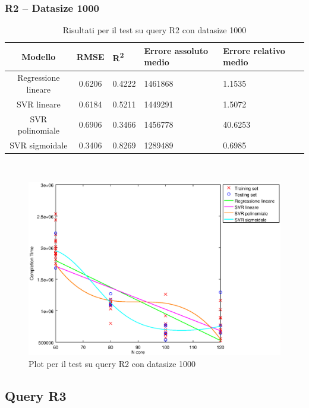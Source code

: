 \documentclass[a4paper,11pt]{article}
\begin{document}
\subsubsection{R2 -- Datasize 1000}
\begin{table}[bhpt]
	\centering
	\begin{adjustbox}{center}
		\begin{tabular}{c | c M{1.2cm} M{2.5cm} M{2.5cm} M{1.8cm}}
			Modello & RMSE & R\textsuperscript{2} & Errore assoluto medio & Errore relativo medio \tabularnewline
			\hline
			Regressione lineare & 0.6206 & 0.4222 & 1461868 & 1.1535 \\
			SVR lineare & 0.6184 & 0.5211 & 1449291 & 1.5072 \\
			SVR polinomiale & 0.6906 & 0.3466 & 1456778 & 40.6253 \\
			SVR sigmoidale & 0.3406 & 0.8269 & 1289489 & 0.6985 \\
		\end{tabular}
	\end{adjustbox}
	\\
	\caption{Risultati per il test su query R2 con datasize 1000}
	\label{table_R2_1000}
\end{table}

\begin {figure}[hbtp]
\centering
\includegraphics[width=\textwidth]{output/R2_1000/plot_R2_1000.eps}
\caption {Plot per il test su query R2 con datasize 1000}
\end {figure}

\newpage
\subsection{Query R3}
\end{document}
